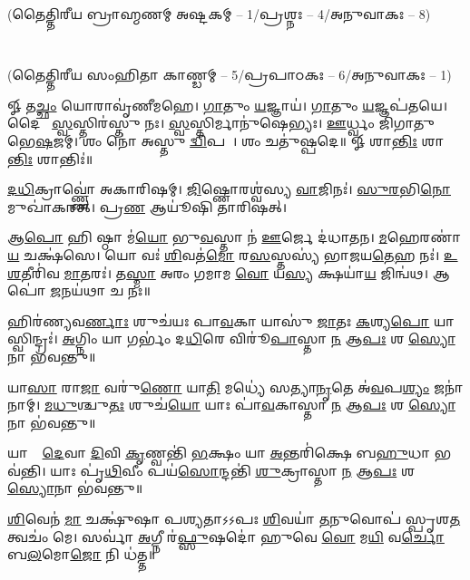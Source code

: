 
\vspace{-1ex}
\centerline{\normalsize(𑌤𑍈𑌤𑍍𑌤𑌿𑌰𑍀𑌯 𑌬𑍍𑌰𑌾𑌹𑍍𑌮𑌣𑌮𑍍 𑌅𑌷𑍍𑌟𑌕𑌮𑍍 -- 1/𑌪𑍍𑌰𑌶𑍍𑌨𑌃 -- 4/𑌅𑌨𑍁𑌵𑌾𑌕𑌃 -- 8)}\mbox{}\\[-2em]
\centerline{\normalsize(𑌤𑍈𑌤𑍍𑌤𑌿𑌰𑍀𑌯 𑌸𑌂𑌹𑌿𑌤𑌾 𑌕𑌾𑌣𑍍𑌡𑌮𑍍 -- 5/𑌪𑍍𑌰𑌪𑌾𑌠𑌕𑌃 -- 6/𑌅𑌨𑍁𑌵𑌾𑌕𑌃 -- 1)}


𑍐 𑌤\ul{𑌚𑍍𑌛𑌂} 𑌯𑍋𑌰𑌾𑌵𑍃॑𑌣𑍀𑌮𑌹𑍇। \ul{𑌗𑌾}𑌤𑍁𑌂 \ul{𑌯}𑌜𑍍𑌞𑌾𑌯॑। \ul{𑌗𑌾}𑌤𑍁𑌂 \ul{𑌯}𑌜𑍍𑌞𑌪॑𑌤𑌯𑍇। 𑌦𑍈𑌵𑍀𑌃᳚ \ul{𑌸𑍍𑌵}𑌸𑍍𑌤𑌿𑌰॑𑌸𑍍𑌤𑍁 𑌨𑌃।
\ul{𑌸𑍍𑌵}𑌸𑍍𑌤𑌿𑌰𑍍𑌮𑌾𑌨𑍁॑𑌷𑍇𑌭𑍍𑌯𑌃। \ul{𑌊}𑌰𑍍𑌧𑍍𑌵𑌂 𑌜𑌿॑𑌗𑌾𑌤𑍁 𑌭𑍇\ul{𑌷}𑌜𑌮𑍍। 𑌶𑌂 𑌨𑍋॑ 𑌅𑌸𑍍𑌤𑍁 \ul{𑌦𑍍𑌵𑌿}𑌪𑌦𑍇᳚। 𑌶𑌂 𑌚𑌤𑍁॑𑌷𑍍𑌪𑌦𑍇॥
𑍐 𑌶𑌾\ul{𑌨𑍍𑌤𑌿𑌃} 𑌶𑌾\ul{𑌨𑍍𑌤𑌿𑌃} 𑌶𑌾𑌨𑍍𑌤𑌿𑌃॑॥

\ul{𑌦}\ul{𑌧𑌿}𑌕𑍍𑌰𑌾𑌵𑍍𑌣𑍍𑌣𑍋॑ 𑌅𑌕𑌾𑌰𑌿𑌷𑌮𑍍। \ul{𑌜𑌿}𑌷𑍍𑌣𑍋𑌰𑌶𑍍𑌵॑𑌸𑍍𑌯 \ul{𑌵𑌾}𑌜𑌿𑌨𑌃॑।
\ul{𑌸𑍁}\ul{𑌰}𑌭𑌿\ul{𑌨𑍋} 𑌮𑍁𑌖𑌾॑𑌕𑌰𑌤𑍍। 𑌪𑍍𑌰\ul{𑌣} 𑌆𑌯𑍂॑𑌷𑌿 𑌤𑌾𑌰𑌿𑌷𑌤𑍍।

𑌆\ul{𑌪𑍋} 𑌹𑌿 𑌷𑍍𑌠𑌾 𑌮॑\ul{𑌯𑍋} 𑌭𑍁\ul{𑌵}𑌸𑍍𑌤𑌾 𑌨॑ \ul{𑌊}𑌰𑍍𑌜𑍇 𑌦॑𑌧𑌾𑌤𑌨।
\ul{𑌮}𑌹𑍇𑌰𑌣𑌾॑\ul{𑌯} 𑌚𑌕𑍍𑌷॑𑌸𑍇। 𑌯𑍋 𑌵𑌃॑ \ul{𑌶𑌿}𑌵𑌤॑\ul{𑌮𑍋} 𑌰\ul{𑌸}𑌸𑍍𑌤𑌸𑍍𑌯॑ 𑌭𑌾𑌜𑌯\ul{𑌤𑍇}𑌹 𑌨𑌃॑।
\ul{𑌉}\ul{𑌶}𑌤𑍀𑌰𑌿॑𑌵 \ul{𑌮𑌾}𑌤𑌰𑌃॑। 𑌤\ul{𑌸𑍍𑌮𑌾} 𑌅𑌰𑌂 𑌗𑌮𑌾𑌮 \ul{𑌵𑍋} 𑌯\ul{𑌸𑍍𑌯} 𑌕𑍍𑌷𑌯𑌾॑\ul{𑌯} 𑌜𑌿𑌨𑍍𑌵॑𑌥।
𑌆𑌪𑍋॑ \ul{𑌜}𑌨𑌯॑𑌥𑌾 𑌚 𑌨𑌃॥

𑌹𑌿𑌰॑𑌣𑍍𑌯𑌵\ul{𑌰𑍍𑌣𑌾𑌃} 𑌶𑍁𑌚॑𑌯𑌃 𑌪𑌾\ul{𑌵}𑌕𑌾 𑌯𑌾𑌸𑍁॑ \ul{𑌜𑌾}𑌤𑌃 \ul{𑌕}𑌶𑍍𑌯\ul{𑌪𑍋} 𑌯𑌾𑌸𑍍𑌵𑌿𑌨𑍍𑌦𑍍𑌰𑌃॑।
\ul{𑌅}𑌗𑍍𑌨𑌿𑌂 𑌯𑌾 𑌗𑌰𑍍𑌭𑌂॑ 𑌦\ul{𑌧𑌿}𑌰𑍇 𑌵𑌿𑌰𑍂॑\ul{𑌪𑌾}𑌸𑍍𑌤𑌾 \ul{𑌨} 𑌆\ul{𑌪𑌃} 𑌶 \ul{𑌸𑍍𑌯𑍋}𑌨𑌾 𑌭॑𑌵𑌨𑍍𑌤𑍁॥

𑌯𑌾\ul{𑌸𑌾}\ul{} 𑌰𑌾\ul{𑌜𑌾} 𑌵𑌰𑍁॑\ul{𑌣𑍋} 𑌯𑌾\ul{𑌤𑌿} 𑌮𑌧𑍍𑌯𑍇॑ 𑌸𑌤𑍍𑌯𑌾\ul{𑌨𑍃}𑌤𑍇 𑌅॑\ul{𑌵}𑌪\ul{𑌶𑍍𑌯𑌂} 𑌜𑌨𑌾॑𑌨𑌾𑌮𑍍।
\ul{𑌮}\ul{𑌧𑍁}𑌶𑍍𑌚𑍁\ul{𑌤𑌃} 𑌶𑍁𑌚॑\ul{𑌯𑍋} 𑌯𑌾𑌃 𑌪𑌾॑\ul{𑌵}𑌕𑌾𑌸𑍍𑌤𑌾 \ul{𑌨} 𑌆\ul{𑌪𑌃} 𑌶 \ul{𑌸𑍍𑌯𑍋}𑌨𑌾 𑌭॑𑌵𑌨𑍍𑌤𑍁॥

𑌯𑌾𑌸𑌾𑌂᳚ \ul{𑌦𑍇}𑌵𑌾 \ul{𑌦𑌿}𑌵𑌿 \ul{𑌕𑍃}𑌣𑍍𑌵𑌨𑍍𑌤𑌿॑ \ul{𑌭}𑌕𑍍𑌷𑌂 𑌯𑌾 \ul{𑌅}𑌨𑍍𑌤𑌰𑌿॑𑌕𑍍𑌷𑍇 𑌬\ul{𑌹𑍁}𑌧𑌾 𑌭𑌵॑𑌨𑍍𑌤𑌿।
𑌯𑌾𑌃 𑌪𑍃॑\ul{𑌥𑌿}𑌵𑍀𑌂 𑌪𑌯॑\ul{𑌸𑍋}𑌨𑍍𑌦𑌨𑍍𑌤𑌿॑ \ul{𑌶𑍁}𑌕𑍍𑌰𑌾𑌸𑍍𑌤𑌾 \ul{𑌨} 𑌆\ul{𑌪𑌃} 𑌶 \ul{𑌸𑍍𑌯𑍋}𑌨𑌾 𑌭॑𑌵𑌨𑍍𑌤𑍁॥

\ul{𑌶𑌿}𑌵𑍇𑌨॑ \ul{𑌮𑌾} 𑌚𑌕𑍍𑌷𑍁॑𑌷𑌾 𑌪𑌶𑍍𑌯𑌤𑌾𑌽𑌽𑌪𑌃 \ul{𑌶𑌿}𑌵𑌯𑌾॑ \ul{𑌤}𑌨𑍁𑌵𑍋𑌪॑ 𑌸𑍍𑌪𑍃𑌶\ul{𑌤} 𑌤𑍍𑌵𑌚𑌂॑ 𑌮𑍇।
𑌸𑌰𑍍𑌵𑌾॑ \ul{𑌅}𑌗𑍍𑌨𑍀 𑌰॑\ul{𑌫𑍍𑌸𑍁}𑌷𑌦𑍋॑ 𑌹𑍁𑌵𑍇 \ul{𑌵𑍋} 𑌮\ul{𑌯𑌿} 𑌵\ul{𑌰𑍍𑌚𑍋} 𑌬\ul{𑌲}𑌮𑍋\ul{𑌜𑍋} 𑌨𑌿 𑌧॑𑌤𑍍𑌤॥

